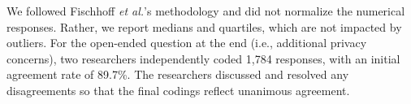 We followed Fischhoff {\it et al.}'s methodology and did not normalize the numerical responses. Rather, we report medians and quartiles, which are not impacted by outliers. For the open-ended question at the end (i.e., additional privacy concerns), two researchers independently coded 1,784 responses, with an initial agreement rate of 89.7\%. The researchers discussed and resolved any disagreements so that the final codings reflect unanimous agreement.